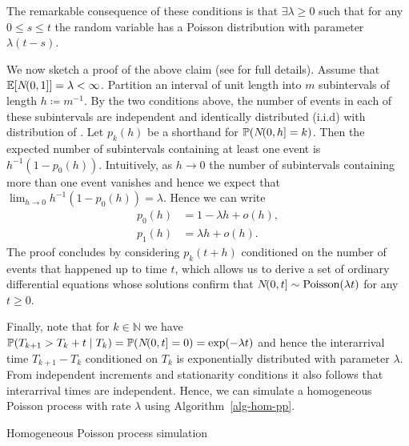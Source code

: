 \documentclass[report.tex]{subfiles}
\begin{document}
\noindent
The remarkable consequence of these conditions is that $\exists \lambda \geq 0$
such that for any $0 \leq s \leq t$ the random variable
 has a Poisson distribution with parameter $\lambda(t-s)$.

We now sketch a proof of the above claim
(see \cite{feller1968Introduction} for full details).
Assume that $\mathbb{E}\!\left[{{N}\!({0},{1}]}\right] = \lambda < \infty$.
Partition an interval of unit length into $m$ subintervals of length
$h \coloneqq m^{-1}$. By the two conditions above, the number of events in each
of these subintervals are independent and identically distributed (i.i.d)
with distribution of .
Let $p_{k}(h)$ be a shorthand for $\mathbb{P}\!\left({{N}\!({0},{h}] = k}\right)$.
Then the expected number of subintervals containing at least one event is
$h^{-1}(1 - p_{0}(h))$.
Intuitively, as $h \to 0$ the number of subintervals containing more than one
event vanishes and hence we expect that
$\lim_{h \to 0}h^{-1}(1 - p_{0}(h)) = \lambda$.
Hence we can write
\begin{equation}
\begin{split}
  \label{hom-pp-characterization}
  p_{0}(h) &= 1 - \lambda h + o(h), \\
  p_{1}(h) &= \lambda h + o(h).
\end{split}
\end{equation}
The proof concludes by considering $p_{k}(t + h)$ conditioned on the number of
events that happened up to time $t$, which allows us to derive a set of ordinary
differential equations whose solutions confirm that
${N}\!({0},{t}] \sim \text{Poisson}(\lambda t)$ for any $t \geq 0$.

Finally, note that for $k \in \mathbb{N}$ we have
$
  \mathbb{P}\!\left({T_{k+1} > T_{k} + t} \mid {T_{k}}\right)
  = \mathbb{P}\!\left({{N}\!({0},{t}] = 0}\right)
  = \exp\!\left({-\lambda t}\right)
$
and hence the interarrival time $T_{k+1} - T_{k}$ conditioned on $T_{k}$
is exponentially distributed with parameter $\lambda$. From independent
increments and stationarity conditions it also follows that interarrival times
are independent. Hence, we can simulate a homogeneous Poisson process
with rate $\lambda$ using Algorithm~\ref{alg-hom-pp}.

\begin{algorithm}
\caption{Homogeneous Poisson process simulation}
\label{alg-hom-pp}
\begin{algorithmic}
  \EndFor
\end{algorithmic}
\end{algorithm}
\end{document}
